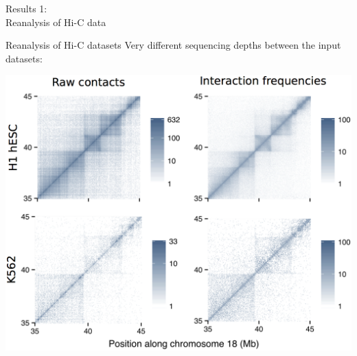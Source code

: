 \documentclass{beamer}
\begin{document}
{
\begin{frame}{}
\begin{tcolorbox}[colback=blue!40!black,colframe=blue!40!black]
\begin{center}
{
{\small Results 1: } \\
 Reanalysis of Hi-C data }
\end{center}
\end{tcolorbox}
\end{frame}
}

\begin{frame}{Reanalysis of Hi-C datasets}
Very different sequencing depths between the input datasets: \\

\vspace{2em}

\centering
\includegraphics[width=.9\textwidth]{../figs/hicnorm.png}

\end{frame}
\end{document}
